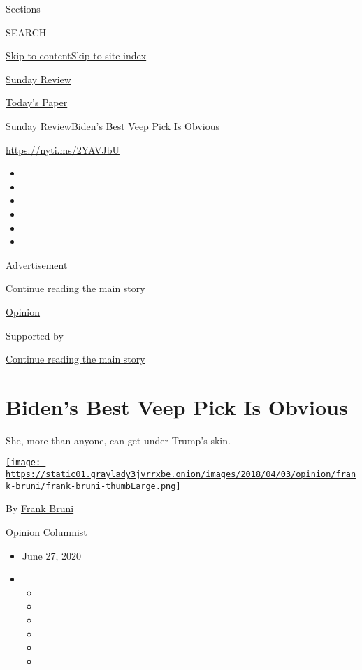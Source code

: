 Sections

SEARCH

\protect\hyperlink{site-content}{Skip to
content}\protect\hyperlink{site-index}{Skip to site index}

\href{https://www.nytimes3xbfgragh.onion/section/opinion/sunday}{Sunday
Review}

\href{https://myaccount.nytimes3xbfgragh.onion/auth/login?response_type=cookie\&client_id=vi}{}

\href{https://www.nytimes3xbfgragh.onion/section/todayspaper}{Today's
Paper}

\href{/section/opinion/sunday}{Sunday Review}\textbar{}Biden's Best Veep
Pick Is Obvious

\url{https://nyti.ms/2YAVJbU}

\begin{itemize}
\item
\item
\item
\item
\item
\item
\end{itemize}

Advertisement

\protect\hyperlink{after-top}{Continue reading the main story}

\href{/section/opinion}{Opinion}

Supported by

\protect\hyperlink{after-sponsor}{Continue reading the main story}

\hypertarget{bidens-best-veep-pick-is-obvious}{%
\section{Biden's Best Veep Pick Is
Obvious}\label{bidens-best-veep-pick-is-obvious}}

She, more than anyone, can get under Trump's skin.

\href{https://www.nytimes3xbfgragh.onion/by/frank-bruni}{\texttt{[image: https://static01.graylady3jvrrxbe.onion/images/2018/04/03/opinion/frank-bruni/frank-bruni-thumbLarge.png]}}

By \href{https://www.nytimes3xbfgragh.onion/by/frank-bruni}{Frank Bruni}

Opinion Columnist

\begin{itemize}
\item
  June 27, 2020
\item
  \begin{itemize}
  \item
  \item
  \item
  \item
  \item
  \item
  \end{itemize}
\end{itemize}

